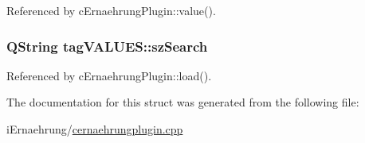 Referenced by c\+Ernaehrung\+Plugin\+::value().

\subsubsection[{\texorpdfstring{sz\+Search}{szSearch}}]{\setlength{\rightskip}{0pt plus 5cm}Q\+String tag\+V\+A\+L\+U\+E\+S\+::sz\+Search}\hypertarget{structtag_v_a_l_u_e_s_a1af4ef8b1eb53303b473be2e9dfe4cdf}{}\label{structtag_v_a_l_u_e_s_a1af4ef8b1eb53303b473be2e9dfe4cdf}


Referenced by c\+Ernaehrung\+Plugin\+::load().



The documentation for this struct was generated from the following file\+:\begin{DoxyCompactItemize}
\item 
i\+Ernaehrung/\hyperlink{cernaehrungplugin_8cpp}{cernaehrungplugin.\+cpp}\end{DoxyCompactItemize}
